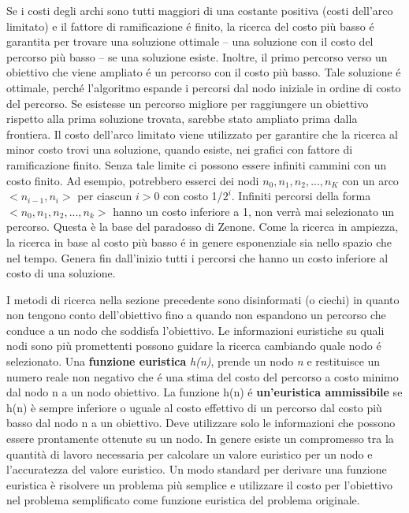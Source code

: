 \documentclass[a4paper]{extarticle}
\begin{document}
Se i costi degli archi sono tutti maggiori di una costante positiva (costi dell'arco limitato) e il fattore di ramificazione é finito, la ricerca del costo più basso é garantita per trovare una soluzione ottimale – una soluzione con il costo del percorso più basso – se una soluzione esiste. Inoltre, il primo percorso verso un obiettivo che viene ampliato é un percorso con il costo più basso. Tale soluzione é ottimale, perché l'algoritmo espande i percorsi dal nodo iniziale in ordine di costo del percorso. Se esistesse un percorso migliore per raggiungere un obiettivo rispetto alla prima soluzione trovata, sarebbe stato ampliato prima dalla frontiera. Il costo dell'arco limitato viene utilizzato per garantire che la ricerca al minor costo trovi una soluzione, quando esiste, nei grafici con fattore di ramificazione finito. Senza tale limite ci possono essere infiniti cammini con un costo finito. Ad esempio, potrebbero esserci dei nodi $n_0,n_1,n_2,...,n_K$ con un arco $<n_{i-1},n_i>$ per ciascun $i>0$ con costo 1/$2^i$. Infiniti percorsi della forma $<n_0,n_1,n_2,...,n_k>$ hanno un costo inferiore a 1, non verrà mai selezionato un percorso. Questa è la base del paradosso di Zenone. Come la ricerca in ampiezza, la ricerca in base al costo più basso é in genere esponenziale sia nello spazio che nel tempo. Genera fin dall'inizio tutti i percorsi che hanno un costo inferiore al costo di una soluzione.

I metodi di ricerca nella sezione precedente sono disinformati (o ciechi) in quanto non tengono conto dell'obiettivo fino a quando non espandono un percorso che conduce a un nodo che soddisfa l'obiettivo. Le informazioni euristiche su quali nodi sono più promettenti possono guidare la ricerca cambiando quale nodo é selezionato. Una \textbf{funzione euristica} \textit{h(n)}, prende un nodo \textit{n} e restituisce un numero reale non negativo che é una stima del costo del percorso a costo minimo dal nodo n a un nodo obiettivo. La funzione h(n) é \textbf{un'euristica ammissibile} se h(n) è sempre inferiore o uguale al costo effettivo di un percorso dal costo più basso dal nodo n a un obiettivo. Deve utilizzare solo le informazioni che possono essere prontamente ottenute su un nodo. In genere esiste un compromesso tra la quantità di lavoro necessaria per calcolare un valore euristico per un nodo e l'accuratezza del valore euristico. Un modo standard per derivare una funzione euristica è risolvere un problema più semplice e utilizzare il costo per l'obiettivo nel problema semplificato come funzione euristica del problema originale.
\end{document}
